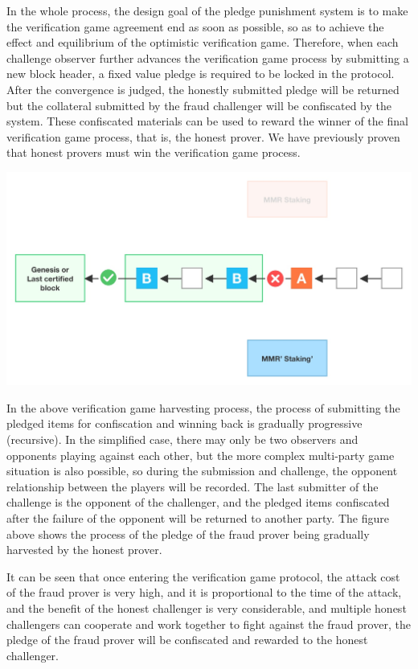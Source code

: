 In the whole process, the design goal of the pledge punishment system is to make the verification game agreement end as soon as possible, so as to achieve the effect and equilibrium of the optimistic verification game. Therefore, when each challenge observer further advances the verification game process by submitting a new block header, a fixed value pledge is required to be locked in the protocol. After the convergence is judged, the honestly submitted pledge will be returned but the collateral submitted by the fraud challenger will be confiscated by the system. These confiscated materials can be used to reward the winner of the final verification game process, that is, the honest prover. We have previously proven that honest provers must win the verification game process.

\includegraphics[scale=0.2]{pic/Verification Game Economic Model 2.jpg}

In the above verification game harvesting process, the process of submitting the pledged items for confiscation and winning back is gradually progressive (recursive). In the simplified case, there may only be two observers and opponents playing against each other, but the more complex multi-party game situation is also possible, so during the submission and challenge, the opponent relationship between the players will be recorded. The last submitter of the challenge is the opponent of the challenger, and the pledged items confiscated after the failure of the opponent will be returned to another party. The figure above shows the process of the pledge of the fraud prover being gradually harvested by the honest prover.

It can be seen that once entering the verification game protocol, the attack cost of the fraud prover is very high, and it is proportional to the time of the attack, and the benefit of the honest challenger is very considerable, and multiple honest challengers can cooperate and work together to fight against the fraud prover, the pledge of the fraud prover will be confiscated and rewarded to the honest challenger.


